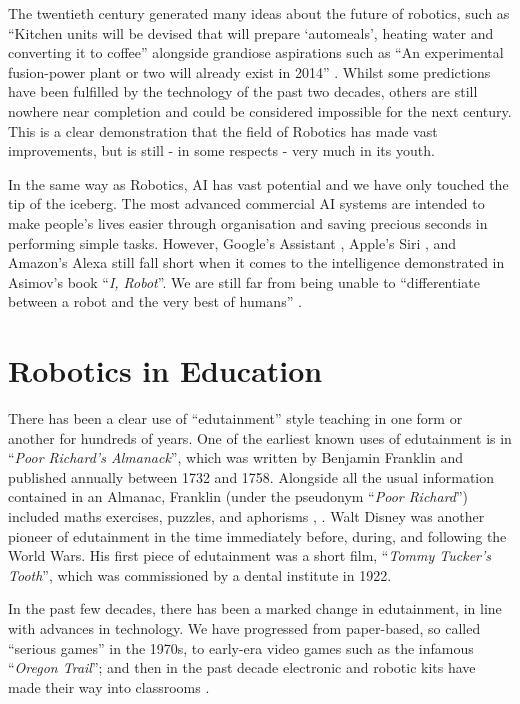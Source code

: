 \documentclass{report}
\newcommand{\tit}[1]{\textit{#1}}
\newcommand{\propernoun}[1]{\enquote{\tit{#1}}}
\begin{document}
    The twentieth century generated many ideas about the future of robotics, such as \enquote{Kitchen units will be devised that will prepare \enquote{automeals}, heating water and converting it to coffee} alongside grandiose aspirations such as \enquote{An experimental fusion-power plant or two will already exist in 2014} \cite{Asimov1964}. Whilst some predictions have been fulfilled by the technology of the past two decades, others are still nowhere near completion and could be considered impossible for the next century. This is a clear demonstration that the field of Robotics has made vast improvements, but is still - in some respects - very much in its youth.
    
    In the same way as Robotics, AI has vast potential and we have only touched the tip of the iceberg. The most advanced commercial AI systems are intended to make people's lives easier through organisation and saving precious seconds in performing simple tasks. However, Google's Assistant \cite{Google2016}, Apple's Siri \cite{Apple2011}, and Amazon's Alexa \cite{Amazon2014} still fall short when it comes to the intelligence demonstrated in Asimov's book \propernoun{I, Robot}. We are still far from being unable to \enquote{differentiate between a robot and the very best of humans} \cite{Asimov1970}.
    
    \section{Robotics in Education}
    There has been a clear use of \enquote{edutainment} style teaching in one form or another for hundreds of years. One of the earliest known uses of edutainment is in \propernoun{Poor Richard's Almanack}, which was written by Benjamin Franklin and published annually between 1732 and 1758. Alongside all the usual information contained in an Almanac, Franklin (under the pseudonym \propernoun{Poor Richard}) included maths exercises, puzzles, and aphorisms \cite{Beato2015}, \cite{Franklin1732}. Walt Disney was another pioneer of edutainment in the time immediately before, during, and following the World Wars. His first piece of edutainment was a short film, \propernoun{Tommy Tucker's Tooth}, which was commissioned by a dental institute in 1922.
    
    In the past few decades, there has been a marked change in edutainment, in line with advances in technology. We have progressed from paper-based, so called \enquote{serious games} in the 1970s, to early-era video games such as the infamous \propernoun{Oregon Trail}; and then in the past decade electronic and robotic kits have made their way into classrooms \cite{Becker}.
    
\end{document}
